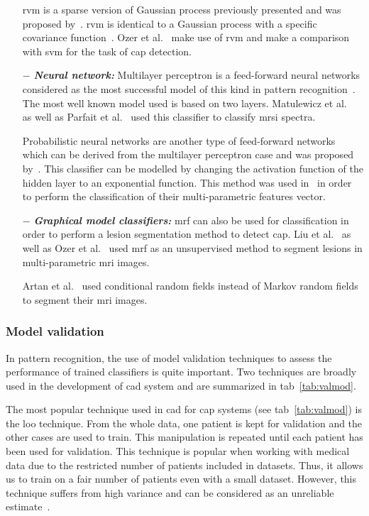 \begin{enumerate}[leftmargin=*]
  \Acf{rvm} is a sparse version of Gaussian process previously presented and was proposed by~\cite{Tipping2001}. \ac{rvm} is identical to a Gaussian process with a specific covariance function~\cite{Quinonero-Candela2002}. Ozer et al.~\cite{Ozer2009,Ozer2010} make use of \ac{rvm} and make a comparison with \ac{svm} for the task of \ac{cap} detection.

\item[$-$] \textbf{\textit{Neural network:}} Multilayer perceptron is a feed-forward neural networks considered as the most successful model of this kind in pattern recognition~\cite{Bishop2006}. The most well known model used is based on two layers. Matulewicz et al.~\cite{Matulewicz2013} as well as Parfait et al.~\cite{Parfait2012} used this classifier to classify \ac{mrsi} spectra.

  Probabilistic neural networks are another type of feed-forward networks which can be derived from the multilayer perceptron case and was proposed by~\cite{Specht1988}. This classifier can be modelled by changing the activation function of the hidden layer to an exponential function. This method was used  in~\cite{Ampeliotis2007,Ampeliotis2008,Viswanath2011} in order to perform the classification of their multi-parametric features vector.

\item[$-$] \textbf{\textit{Graphical model classifiers:}} \ac{mrf} can also be used for classification in order to perform a lesion segmentation method to detect \ac{cap}. Liu et al.~\cite{Liu2009} as well as Ozer et al.~\cite{Ozer2010} used \ac{mrf} as an unsupervised method to segment lesions in multi-parametric \ac{mri} images.

 Artan et al.~\cite{Artan2009,Artan2010} used conditional random fields instead of Markov random fields to segment their \ac{mri} images.
\end{enumerate}

\subsubsection{Model validation}

In pattern recognition, the use of model validation techniques to assess the performance of trained classifiers is quite important. Two techniques are broadly used in the development of \ac{cad} system and are summarized in \ac{tab}~\ref{tab:valmod}.

The most popular technique used in \ac{cad} for \ac{cap} systems (see \ac{tab}~\ref{tab:valmod}) is the \acf{loo} technique. From the whole data, one patient is kept for validation and the other cases are used to train. This manipulation is repeated until each patient has been used for validation. This technique is popular when working with medical data due to the restricted number of patients included in datasets. Thus, it allows us to train on a fair number of patients even with a small dataset. However, this technique suffers from high variance and can be considered as an unreliable estimate~\cite{Efron1983}.

